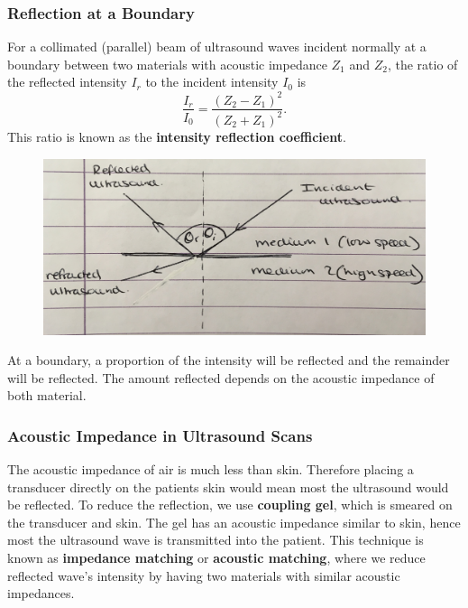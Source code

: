 \subsubsection*{Reflection at a Boundary}

For a collimated (parallel) beam of ultrasound waves incident normally at a boundary between two materials with acoustic impedance $Z_1$ and $Z_2$, the ratio of the reflected intensity $I_r$ to the incident intensity $I_0$ is
\begin{equation}
    \frac{I_r}{I_0} = \frac{(Z_2 - Z_1)^2}{(Z_2 + Z_1)^2}.
\end{equation}
This ratio is known as the \textbf{intensity reflection  coefficient}.

\begin{figure}[h!]
    \centering
    \includegraphics[scale=0.1]{notes/images/Ultrasound-2.JPG}
\end{figure}
\FloatBarrier

At a boundary, a proportion of the intensity will be reflected and the remainder will be reflected. The amount reflected depends on the acoustic impedance of both material. 

\subsubsection*{Acoustic Impedance in Ultrasound Scans}

The acoustic impedance of air is much less than skin. Therefore placing a transducer directly on the patients skin would mean most the ultrasound would be reflected. To reduce the reflection, we use \textbf{coupling gel}, which is smeared on the transducer and skin. The gel has an acoustic impedance similar to skin, hence most the ultrasound wave is transmitted into the patient. This technique is known as \textbf{impedance matching} or \textbf{acoustic matching}, where we reduce reflected wave's intensity by having two materials with similar acoustic impedances. 

